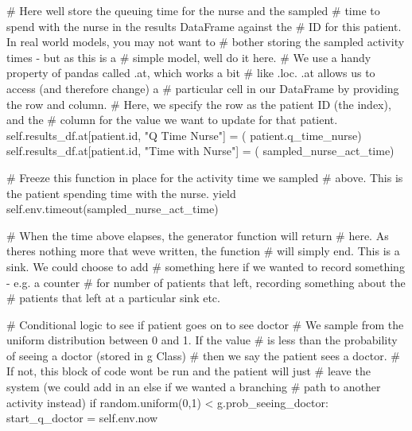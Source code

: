 \documentclass[
  letterpaper,
  DIV=11,
  numbers=noendperiod]{scrreprt}
\newenvironment{Shaded}{}{}
\newcommand{\BuiltInTok}[1]{\textcolor[rgb]{0.84,0.23,0.29}{#1}}
\newcommand{\CommentTok}[1]{\textcolor[rgb]{0.42,0.45,0.49}{#1}}
\newcommand{\ControlFlowTok}[1]{\textcolor[rgb]{0.84,0.23,0.29}{#1}}
\newcommand{\DecValTok}[1]{\textcolor[rgb]{0.00,0.36,0.77}{#1}}
\newcommand{\NormalTok}[1]{\textcolor[rgb]{0.14,0.16,0.18}{#1}}
\newcommand{\OperatorTok}[1]{\textcolor[rgb]{0.14,0.16,0.18}{#1}}
\newcommand{\StringTok}[1]{\textcolor[rgb]{0.01,0.18,0.38}{#1}}
\newcommand{\VariableTok}[1]{\textcolor[rgb]{0.89,0.38,0.04}{#1}}
\begin{document}
\begin{tcolorbox}
\begin{Shaded}
\begin{Highlighting}[]
            \CommentTok{\# Here we\textquotesingle{}ll store the queuing time for the nurse and the sampled}
            \CommentTok{\# time to spend with the nurse in the results DataFrame against the}
            \CommentTok{\# ID for this patient.  In real world models, you may not want to}
            \CommentTok{\# bother storing the sampled activity times {-} but as this is a}
            \CommentTok{\# simple model, we\textquotesingle{}ll do it here.}
            \CommentTok{\# We use a handy property of pandas called .at, which works a bit}
            \CommentTok{\# like .loc.  .at allows us to access (and therefore change) a}
            \CommentTok{\# particular cell in our DataFrame by providing the row and column.}
            \CommentTok{\# Here, we specify the row as the patient ID (the index), and the}
            \CommentTok{\# column for the value we want to update for that patient.}
            \VariableTok{self}\NormalTok{.results\_df.at[patient.}\BuiltInTok{id}\NormalTok{, }\StringTok{"Q Time Nurse"}\NormalTok{] }\OperatorTok{=}\NormalTok{ (}
\NormalTok{                patient.q\_time\_nurse)}
            \VariableTok{self}\NormalTok{.results\_df.at[patient.}\BuiltInTok{id}\NormalTok{, }\StringTok{"Time with Nurse"}\NormalTok{] }\OperatorTok{=}\NormalTok{ (}
\NormalTok{                sampled\_nurse\_act\_time)}

            \CommentTok{\# Freeze this function in place for the activity time we sampled}
            \CommentTok{\# above.  This is the patient spending time with the nurse.}
            \ControlFlowTok{yield} \VariableTok{self}\NormalTok{.env.timeout(sampled\_nurse\_act\_time)}

            \CommentTok{\# When the time above elapses, the generator function will return}
            \CommentTok{\# here.  As there\textquotesingle{}s nothing more that we\textquotesingle{}ve written, the function}
            \CommentTok{\# will simply end.  This is a sink.  We could choose to add}
            \CommentTok{\# something here if we wanted to record something {-} e.g. a counter}
            \CommentTok{\# for number of patients that left, recording something about the}
            \CommentTok{\# patients that left at a particular sink etc.}

        \CommentTok{\# Conditional logic to see if patient goes on to see doctor}
        \CommentTok{\# We sample from the uniform distribution between 0 and 1.  If the value}
        \CommentTok{\# is less than the probability of seeing a doctor (stored in g Class)}
        \CommentTok{\# then we say the patient sees a doctor.}
        \CommentTok{\# If not, this block of code won\textquotesingle{}t be run and the patient will just}
        \CommentTok{\# leave the system (we could add in an else if we wanted a branching}
        \CommentTok{\# path to another activity instead)}
        \ControlFlowTok{if}\NormalTok{ random.uniform(}\DecValTok{0}\NormalTok{,}\DecValTok{1}\NormalTok{) }\OperatorTok{\textless{}}\NormalTok{ g.prob\_seeing\_doctor:}
\NormalTok{            start\_q\_doctor }\OperatorTok{=} \VariableTok{self}\NormalTok{.env.now}


\end{Highlighting}
\end{Shaded}
\end{tcolorbox}
\end{document}

